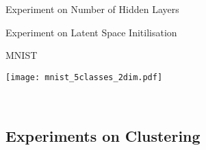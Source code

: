 \begin{frame}{Experiment on Number of Hidden Layers}
    \small
    \begin{minipage}{.48\textwidth}
        \setlength\figureheight{\textheight}
        \setlength{}
        \begin{figure}
            
        \end{figure}
    \end{minipage}
    \begin{minipage}{.48\textwidth}
        \setlength\figureheight{\textheight}
        \setlength{}
        \begin{figure}
            
        \end{figure}
    \end{minipage}
\end{frame}

\begin{frame}{Experiment on Latent Space Initilisation}
    \small
    \setlength\figureheight{.49\textheight}
    \setlength\figurewidth{\textwidth}

    
    \setlength\figureheight{.49\textheight}
    \setlength\figurewidth{\textwidth}
    

\end{frame}

\begin{frame}{MNIST}
    \begin{minipage}{.49\textwidth}
        \texttt{[image: mnist\_5classes\_2dim.pdf]}
    \end{minipage}
    \begin{minipage}{.49\textwidth}
        \flushright
        \setlength\figureheight{.49\textheight}
        \setlength{}
        \\
        \flushright
        
    \end{minipage}

\end{frame}

\subsection{Experiments on Clustering}

